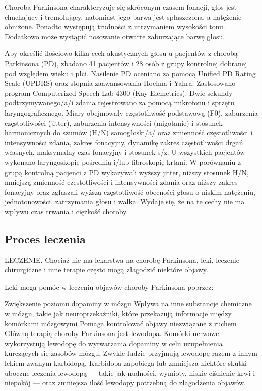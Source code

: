 Choroba Parkinsona charakteryzuje się skróconym czasem fonacji, głos jest chuchający i tremolujący, natomiast jego barwa jest
spłaszczona, a natężenie obniżone.
Ponadto występują trudności z utrzymaniem wysokości tonu.
Dodatkowo może wystąpić nosowanie otwarte zaburzające barwę głosu\cite{Kuryłowicz_2019}.

Aby określić ilościowo kilka cech akustycznych głosu u pacjentów z chorobą Parkinsona (PD), zbadano 41 pacjentów i 28
osób z grupy kontrolnej dobranej pod względem wieku i płci. Nasilenie PD oceniano za pomocą Unified PD Rating Scale
(UPDRS) oraz stopnia zaawansowania Hoehna i Yahra. Zastosowano program Computerized Speech Lab 4300 (Kay Elemetrics).
Dwie sekundy podtrzymywanego/a/i zdania rejestrowano za pomocą mikrofonu i sprzętu laryngograficznego. Miary obejmowały
częstotliwość podstawową (F0), zaburzenia częstotliwości (jitter), zaburzenia intensywności (migotanie) i stosunek
harmonicznych do szumów (H/N) samogłoski/a/ oraz zmienność częstotliwości i intensywności zdania, zakres fonacyjny,
dynamikę zakres częstotliwości drgań własnych, maksymalny czas fonacyjny i stosunek s/z. U wszystkich pacjentów
wykonano laryngoskopię pośrednią i/lub fibroskopię krtani. W porównaniu z grupą kontrolną pacjenci z PD wykazywali
wyższy jitter, niższy stosunek H/N, mniejszą zmienność częstotliwości i intensywności zdania oraz niższy zakres
fonacyjny oraz zgłaszali wyższą częstotliwość obecności głosu o niskim natężeniu, jednotonowości, zatrzymania głosu i
walka. Wydaje się, że na te cechy nie ma wpływu czas trwania i ciężkość choroby. \cite{GAMBOA1997314}

\subsection{Proces leczenia}
\label{subsec:leczenie}
{LECZENIE}\cite{National_Institute_on_Aging_2022}.
Chociaż nie ma lekarstwa na chorobę Parkinsona, leki, leczenie chirurgiczne i inne terapie często mogą złagodzić niektóre objawy.

Leki mogą pomóc w leczeniu objawów choroby Parkinsona poprzez:

Zwiększenie poziomu dopaminy w mózgu
Wpływa na inne substancje chemiczne w mózgu, takie jak neuroprzekaźniki, które przekazują informacje między komórkami mózgowymi
Pomaga kontrolować objawy niezwiązane z ruchem
Główną terapią choroby Parkinsona jest lewodopa. Komórki nerwowe wykorzystują lewodopę do wytwarzania dopaminy w celu uzupełnienia kurczących się zasobów mózgu. Zwykle ludzie przyjmują lewodopę razem z innym lekiem zwanym karbidopą. Karbidopa zapobiega lub zmniejsza niektóre skutki uboczne leczenia lewodopą — takie jak nudności, wymioty, niskie ciśnienie krwi i niepokój — oraz zmniejsza ilość lewodopy potrzebną do złagodzenia objawów.

